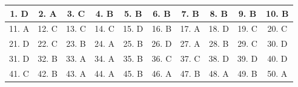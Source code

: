 \documentclass[12pt,a4paper]{article}
\begin{document}
\begin{center}\begin{tabular}{|c|c|c|c|c|c|c|c|c|c|}
\hline
1. D & 2. A & 3. C & 4. B & 5. B & 6. B & 7. B & 8. B & 9. B & 10. B\\\hline
11. A & 12. C & 13. C & 14. C & 15. D & 16. B & 17. A & 18. D & 19. C & 20. C\\\hline
21. D & 22. C & 23. B & 24. A & 25. B & 26. D & 27. A & 28. B & 29. C & 30. D\\\hline
31. D & 32. B & 33. A & 34. A & 35. B & 36. C & 37. C & 38. D & 39. D & 40. D\\\hline
41. C & 42. B & 43. A & 44. A & 45. B & 46. A & 47. B & 48. A & 49. B & 50. A\\\hline
\end{tabular}\end{center}
\end{document}

